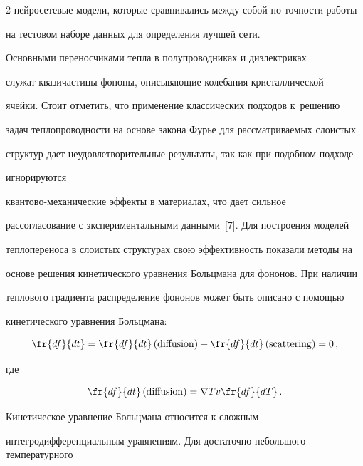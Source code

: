 \begin{multicols}{2}
нейросетевые модели, которые сравнивались между собой по точ\-ности работы 


на тестовом наборе данных для определения лучшей сети.


    


    Основными переносчиками тепла в полупроводниках и диэлектриках 


служат квази\-час\-ти\-цы-фо\-но\-ны, описывающие колебания кристаллической 


ячейки. Стоит отметить, что применение классических подходов к~решению 


задач теплопроводности на основе закона Фурье для рас\-смат\-ри\-ва\-емых слоистых 


структур дает неудовлетворительные результаты, так как  при подобном подходе 


игнорируются  


кван\-то\-во-ме\-ха\-ни\-че\-ские эффекты в материалах, что дает сильное 


рассогласование с экспериментальными данными~[7]. Для построения моделей 


теплопереноса в слоистых структурах свою эффективность показали методы на 


основе решения кинетического уравнения Больцмана для фононов. При наличии 


теплового градиента распределение фононов может быть описано с помощью 


кинетического уравнения Больцмана:





\noindent


    \begin{equation*}


    \fr{df}{dt}= 


\fr{df}{dt}\left(\mathrm{diffusion}\right)+\fr{df}{dt}\left(\mathrm{scattering}\right)=0\,,


\end{equation*}


где


$$


    \fr{df}{dt}\left( \mathrm{diffusion}\right)=\nabla T v \fr{df}{dT}\,.


  $$


    


    Кинетическое уравнение Больцмана относится к сложным 


    ин\-тег\-ро\-диф\-фе\-рен\-ци\-аль\-ным уравнениям. Для достаточно небольшого температурного 



\end{multicols}
